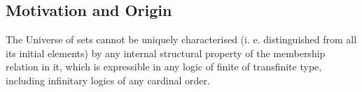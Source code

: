 \subsection{Motivation and Origin}
\begin{displayquote}
The Universe of sets cannot be uniquely characterised (i. e. distinguished from all its initial elements) by any internal structural property of the membership relation in it, which is expressible in any logic of finite of transfinite type, including infinitary logics of any cardinal order.
\end{displayquote}
\begin{comment}
To understand why need reflection in the first place, let's think about infinity for a moment. In the intuitive sense, infinity is an upper limit of all numbers. 
But for centuries, this was merely a philosophical concept of limitlessness. %
Probably the best-known classic problems involving infinity are the famous paradoxes of Zeno. %
In response to those, Aristotle introduced the distinction between an actual and a potential infinity\footnote{See Aristotle’s Physics, Book III}. %
By potential infinity we understand that concept of a process does in unbounded in a sense that it could continue for an arbitrary amount of time, but is also never complete. %
Actual infinity, is, on the other hand, the concept of infinity contained in a bounded space, just like the number of fractions between 0 and 1. Aristotle argued, that the potential infinity is (in today's words) well defined, as opposed to the actual infinity, which is a vague and incoherent concept. He didn't think it's possible for infinite amount of entities to inhabit a bounded place in space or time, rejecting Zeno's thought experiments as a whole. But it's not our aim to get into much detail.  %
The aspect of infinity that is relevant to our interests is the human inability to directly experience limitlessness in contrast to how easily can one talk about infinity and limitlessness in the natural language. 
The short trip into history hopefully served as an example of the fact that certain statements can easily be considered either meaningful or meaningless.  %
But while infinity of any kind can't be experienced directly through senses, much effort has been made by philosophers to find a way to meaningfully talk about infinite. 
To see how this leads to reflection, see what Aquinas wrote in his Summa Theologica \footnote{Part I, Question 7, Article 3, Reply to Objection 1}:

\end{comment}
